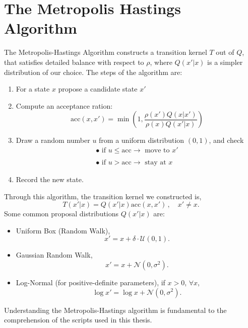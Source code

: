 \documentclass{book}
\begin{document}
	\section{The Metropolis Hastings Algorithm}
	The Metropolis-Hastings Algorithm constructs a transition kernel $T$ out of $Q$, that satisfies detailed balance with respect to $\rho$, where  $Q(x'|x)$ is a simpler distribution of our choice. The steps of the algorithm are:
	\begin{enumerate}
		\item For a state $x$ propose a candidate state $x'$ 
		\item Compute an acceptance ration:
		\begin{equation}
			\label{acceptance_ratio}
			\text{acc}(x,x')=\min \left(1, \frac{\rho(x')Q(x|x')}{\rho(x)Q(x'|x)}\right)
		\end{equation}
		\item Draw a random number $u$ from a uniform distribution $(0,1)$, and check
		\begin{equation*}
			\begin{array}{c}
				\bullet\text{  if }u \leq \text{acc} \rightarrow \text{ move to } x' \\ \, \\
				\bullet\text{  if }u > \text{acc} \rightarrow \text{ stay at } x
			\end{array}
		\end{equation*}
		\item Record the new state.
	\end{enumerate}
	Through this algorithm, the transition kernel we constructed is,
	\begin{equation}
		\label{acceptance_kernel}
		T(x'|x)=Q(x'|x)\text{acc}(x,x') \, , \quad x' \neq x.
	\end{equation}
	Some common proposal distributions $Q(x'|x)$ are:
	\begin{itemize}
		\item Uniform Box (Random Walk),
		\begin{equation*}
			x'=x+\delta \cdot \mathcal{U}(0,1).
		\end{equation*}
		\item Gaussian Random Walk,
		\begin{equation*}
			x'=x+\mathcal{N}(0,\sigma^2).
		\end{equation*}
		\item Log-Normal (for positive-definite parameters), if $x>0$, $\forall x$, 
		\begin{equation*}
			\log x'=\log x + \mathcal{N}(0,\sigma^2).
		\end{equation*}
	\end{itemize}
	Understanding the Metropolis-Hastings algorithm is fundamental to the comprehension of the scripts used in this thesis. 
\end{document}
